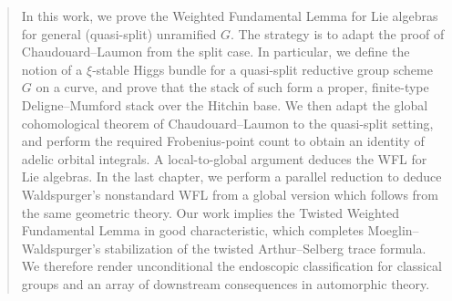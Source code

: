 
\newcommand{\newabstract}[1]{%
  \par\bigskip
  \csname otherlanguage*\endcsname{#1}%
  \csname captions#1\endcsname
  \item[\hskip\labelsep\scshape\abstractname.]
}

\begin{abstract}




In this work, we prove the Weighted Fundamental Lemma for Lie algebras for general (quasi-split) unramified $G$. The strategy is to adapt the proof of Chaudouard--Laumon from the split case. In particular, we define the notion of a $\xi$-stable Higgs bundle for a quasi-split reductive group scheme $G$ on a curve, and prove that the stack of such form a proper, finite-type Deligne--Mumford stack over the Hitchin base. We then adapt the global cohomological theorem of Chaudouard--Laumon to the quasi-split setting, and perform the required Frobenius-point count to obtain an identity of adelic orbital integrals. A local-to-global argument deduces the WFL for Lie algebras. In the last chapter, we perform a parallel reduction to deduce Waldspurger's nonstandard WFL from a global version which follows from the same geometric theory. Our work implies the Twisted Weighted Fundamental Lemma in good characteristic, which completes Moeglin--Waldspurger's stabilization of the twisted Arthur--Selberg trace formula. We therefore render unconditional the endoscopic classification for classical groups and an array of downstream consequences in automorphic theory.


\end{abstract}
